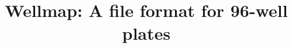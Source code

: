 \documentclass[twocolumn]{bmcart}
\begin{document}
\begin{frontmatter}

\begin{fmbox}


\title{Wellmap: A file format for 96-well plates}


\author[
   addressref={wyss},                   %
   email={kale@thekunderts.net}         %
]{ }


\address[id=wyss]{%
  ,
  ,
}


\begin{artnotes}
\end{artnotes}


\end{fmbox}
\end{frontmatter}
\end{document}

